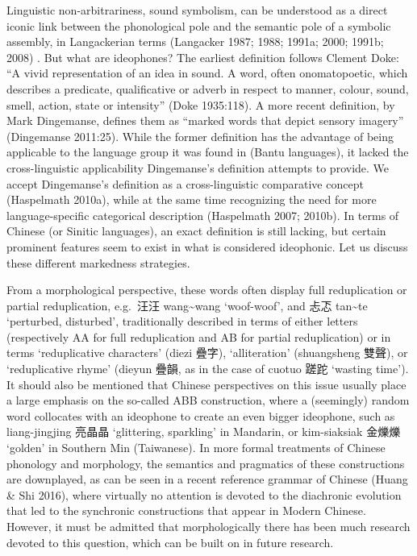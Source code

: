 Linguistic non-arbitrariness, sound symbolism, can be understood as a
direct iconic link between the phonological pole and the semantic pole
of a symbolic assembly, in Langackerian terms (Langacker 1987; 1988;
1991a; 2000; 1991b; 2008) . But what are ideophones? The earliest
definition follows Clement Doke: ``A vivid representation of an idea in
sound. A word, often onomatopoetic, which describes a predicate,
qualificative or adverb in respect to manner, colour, sound, smell,
action, state or intensity'' (Doke 1935:118). A more recent definition,
by Mark Dingemanse, defines them as ``marked words that depict sensory
imagery'' (Dingemanse 2011:25). While the former definition has the
advantage of being applicable to the language group it was found in
(Bantu languages), it lacked the cross-linguistic applicability
Dingemanse's definition attempts to provide. We accept Dingemanse's
definition as a cross-linguistic comparative concept (Haspelmath 2010a),
while at the same time recognizing the need for more language-specific
categorical description (Haspelmath 2007; 2010b). In terms of Chinese
(or Sinitic languages), an exact definition is still lacking, but
certain prominent features seem to exist in what is considered
ideophonic. Let us discuss these different markedness strategies.

From a morphological perspective, these words often display full
reduplication or partial reduplication, e.g.~汪汪
wang\textasciitilde{}wang `woof-woof', and 忐忑 tan\textasciitilde{}te
`perturbed, disturbed', traditionally described in terms of either
letters (respectively AA for full reduplication and AB for partial
reduplication) or in terms `reduplicative characters' (diezi 疊字),
`alliteration' (shuangsheng 雙聲), or `reduplicative rhyme' (dieyun
疊韻, as in the case of cuotuo 蹉跎 `wasting time'). It should also be
mentioned that Chinese perspectives on this issue usually place a large
emphasis on the so-called ABB construction, where a (seemingly) random
word collocates with an ideophone to create an even bigger ideophone,
such as liang-jingjing 亮晶晶 `glittering, sparkling' in Mandarin, or
kim-siaksiak 金爍爍 `golden' in Southern Min (Taiwanese). In more formal
treatments of Chinese phonology and morphology, the semantics and
pragmatics of these constructions are downplayed, as can be seen in a
recent reference grammar of Chinese (Huang \& Shi 2016), where virtually
no attention is devoted to the diachronic evolution that led to the
synchronic constructions that appear in Modern Chinese. However, it must
be admitted that morphologically there has been much research devoted to
this question, which can be built on in future research.

